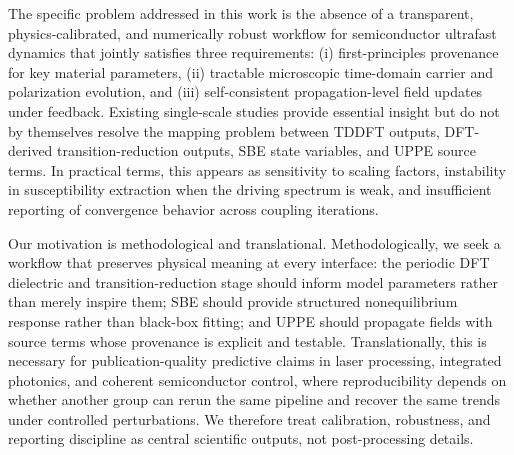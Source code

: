 \documentclass[aps,pra,twocolumn,reprint,superscriptaddress,nofootinbib]{revtex4-2}
\begin{document}
The specific problem addressed in this work is the absence of a transparent,
physics-calibrated, and numerically robust workflow for semiconductor ultrafast
dynamics that jointly satisfies three requirements: (i) first-principles
provenance for key material parameters, (ii) tractable microscopic time-domain
carrier and polarization evolution, and (iii) self-consistent propagation-level
field updates under feedback. Existing single-scale studies provide essential
insight but do not by themselves resolve the mapping problem between TDDFT
outputs, DFT-derived transition-reduction outputs, SBE state variables, and
UPPE source terms. In practical terms, this
appears as sensitivity to scaling factors, instability in susceptibility
extraction when the driving spectrum is weak, and insufficient reporting of
convergence behavior across coupling iterations.

Our motivation is methodological and translational. Methodologically, we seek a
workflow that preserves physical meaning at every interface: the periodic DFT
dielectric and transition-reduction stage should inform model parameters rather
than merely inspire them; SBE should provide structured nonequilibrium response
rather than black-box fitting; and UPPE should propagate fields with source terms
whose provenance is explicit and testable. Translationally,
this is necessary for publication-quality predictive claims in laser processing,
integrated photonics, and coherent semiconductor control, where reproducibility
depends on whether another group can rerun the same pipeline and recover the same
trends under controlled perturbations. We therefore treat calibration,
robustness, and reporting discipline as central scientific outputs, not
post-processing details.
\end{document}
